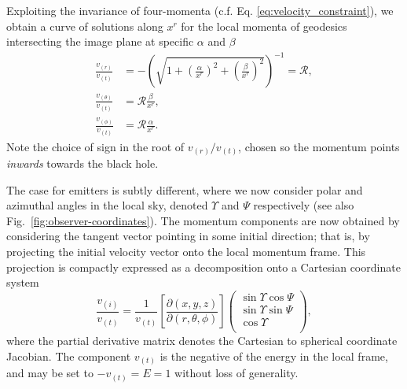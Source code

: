 \documentclass[fleqn,usenatbib]{mnras}
\newcommand{\pderiv}[2]{\frac{\partial #1}{\partial #2}}
\begin{document}
Exploiting the invariance of four-momenta (c.f. Eq.
\eqref{eq:velocity_constraint}), we obtain a curve of solutions along $x^r$ for
the local momenta of geodesics intersecting the image plane at specific
$\alpha$ and
$\beta$
\begin{align}
    \frac{v_{(r)}}{v_{(t)}} &= -\left( \sqrt{1 + \left(\frac{\alpha}{x^r}\right)^2 + \left(\frac{\beta}{x^r}\right)^2} \right)^{-1} = \mathscr{R}, \\
    \frac{v_{(\theta)}}{v_{(t)}} &= \mathscr{R} \frac{\beta}{x^r}, \\
    \frac{v_{(\phi)}}{v_{(t)}} &= \mathscr{R} \frac{\alpha}{x^r}.
\end{align}
Note the choice of sign in the root of $v_{(r)} / v_{(t)}$, chosen so the
momentum points \emph{inwards} towards the black hole.

The case for emitters is subtly different, where we now consider polar and
azimuthal angles in the local sky, denoted $\Upsilon$ and $\Psi$ respectively (see
also Fig.~\ref{fig:observer-coordinates}). The momentum components are now
obtained by considering the tangent vector pointing in some initial direction;
that is, by projecting the initial velocity vector onto the local momentum
frame. This projection is compactly expressed as a decomposition onto a
Cartesian coordinate system
\begin{equation}
    \label{eq:local-angle-to-velocity}
    \frac{v_{(i)}}{v_{(t)}} = \frac{1}{v_{(t)}}
    \left[\pderiv{(x, y, z)}{(r, \theta, \phi)}\right]
    \left(
    \begin{matrix}
        \sin \Upsilon \cos \Psi \\
        \sin \Upsilon \sin \Psi \\
        \cos \Upsilon \\
    \end{matrix}
    \right),
\end{equation}
where the partial derivative matrix denotes the Cartesian to spherical
coordinate Jacobian. The component $v_{(t)}$ is the negative of the energy in
the local frame, and may be set to $-v_{(t)}=E=1$ without loss of generality.
\end{document}
